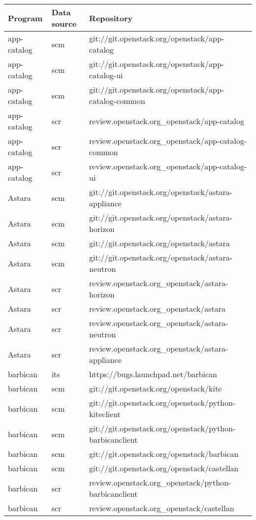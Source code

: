 \begin{center}                                                                       
\begin{longtable}{|p{4cm}|p{1cm}|p{10cm}|}
\hline
Program & Data source & Repository \\
\hline


app-catalog&scm&git://git.openstack.org/openstack/app-catalog\\ 
app-catalog&scm&git://git.openstack.org/openstack/app-catalog-ui\\ 
app-catalog&scm&git://git.openstack.org/openstack/app-catalog-common\\ 
app-catalog&scr&review.openstack.org\_openstack/app-catalog\\ 
app-catalog&scr&review.openstack.org\_openstack/app-catalog-common\\ 
app-catalog&scr&review.openstack.org\_openstack/app-catalog-ui\\ 
Astara&scm&git://git.openstack.org/openstack/astara-appliance\\ 
Astara&scm&git://git.openstack.org/openstack/astara-horizon\\ 
Astara&scm&git://git.openstack.org/openstack/astara\\ 
Astara&scm&git://git.openstack.org/openstack/astara-neutron\\ 
Astara&scr&review.openstack.org\_openstack/astara-horizon\\ 
Astara&scr&review.openstack.org\_openstack/astara\\ 
Astara&scr&review.openstack.org\_openstack/astara-neutron\\ 
Astara&scr&review.openstack.org\_openstack/astara-appliance\\ 
barbican&its&https://bugs.launchpad.net/barbican\\ 
barbican&scm&git://git.openstack.org/openstack/kite\\ 
barbican&scm&git://git.openstack.org/openstack/python-kiteclient\\ 
barbican&scm&git://git.openstack.org/openstack/python-barbicanclient\\ 
barbican&scm&git://git.openstack.org/openstack/barbican\\ 
barbican&scm&git://git.openstack.org/openstack/castellan\\ 
barbican&scr&review.openstack.org\_openstack/python-barbicanclient\\ 
barbican&scr&review.openstack.org\_openstack/castellan\\ 

\end{longtable}
\end{center}
